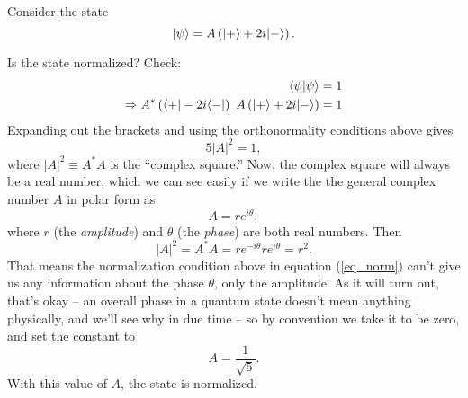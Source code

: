 \begin{example}[Normalization]  Consider the state 
\begin{equation}
| \psi \rangle = A \left( | + \rangle + 2i | - \rangle \right).
\end{equation}

Is the state normalized?  Check:
\begin{align*}
\langle \psi | \psi \rangle &= 1 \\
\Rightarrow A^* \left( \langle + | - 2i \langle - | \right) \ A \left( | + \rangle + 2i| - \rangle \right) &=  1
\end{align*}
Expanding out the brackets and using the orthonormality conditions above gives
\begin{equation}
\label{eq_norm}
5 |A|^2 = 1,
\end{equation}
where $|A|^2 \equiv A^* A$ is the ``complex square.''  Now, the complex square will always be a real number, which we can see easily if we write the the general complex number $A$ in polar form as
\[
A = r e^{i\theta},
\]
where $r$ (the \emph{amplitude}) and $\theta$ (the \emph{phase}) are both real numbers.  Then 
\[
|A|^2 = A^* A = re^{-i\theta} r e^{i\theta} = r^2.
\]
That means the normalization condition above in equation (\ref{eq_norm}) can't give us any information about the phase $\theta$, only the amplitude.  As it will turn out, that's okay -- an overall phase in a quantum state doesn't mean anything physically, and we'll see why in due time -- so by convention we take it to be zero, and set the constant to 
\[
A = \frac{1}{\sqrt{5}}.
\]
With this value of $A$, the state is normalized.
\end{example}

